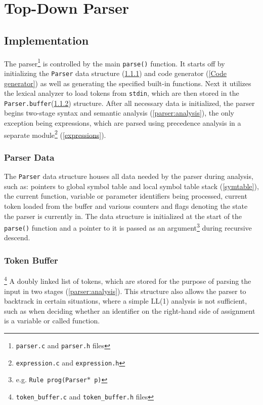 \section{Top-Down Parser}
\label{parser:head}


\subsection{Implementation} 
\label{parser:implementation}
The parser\footnote{\texttt{parser.c} and \texttt{parser.h} files} is controlled by the main \texttt{parse()} function. It starts off by initializing the \texttt{Parser} data structure (\ref{parser:datastruct}) and code generator (\ref{Code generator}) as well as generating the specified built-in functions. Next it utilizes the lexical analyzer to load tokens from \texttt{stdin}, which are then stored in the \texttt{Parser.buffer}(\ref{parser:tokenbuf}) structure. After all necessary data is initialized, the parser begins two-stage syntax and semantic analysis (\ref{parser:analysis}), the only exception being expressions, which are parsed using precedence analysis in a separate module\footnote{\texttt{expression.c} and \texttt{expression.h}} (\ref{expressions}).

\subsubsection{Parser Data} 
\label{parser:datastruct}
The \texttt{Parser} data structure houses all data needed by the parser during analysis, such as: pointers to global symbol table and local symbol table stack (\ref{symtable}), the current function, variable or parameter identifiers being processed, current token loaded from the buffer and various counters and flags denoting
the state the parser is currently in. The data structure is initialized at the start of the \texttt{parse()} function and a pointer to it is passed as an argument\footnote{e.g. \texttt{Rule prog(Parser$*$ p)}} during recursive descend.

\subsubsection{Token Buffer}
\label{parser:tokenbuf}
\footnote{\texttt{token\_buffer.c} and \texttt{token\_buffer.h} files} 
A doubly linked list of tokens, which are stored for the purpose of parsing the input in two stages (\ref{parser:analysis}). This structure also allows the parser to backtrack in certain situations, where a simple LL(1) analysis is not sufficient, such as when deciding whether an identifier on the right-hand side of assignment is a variable or called function.


